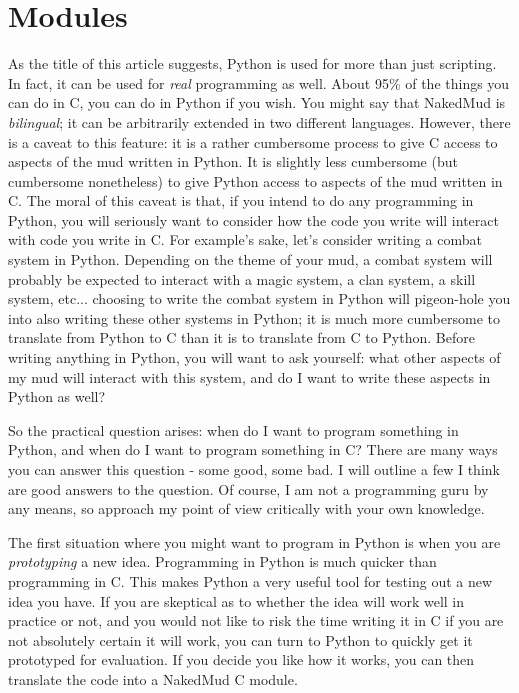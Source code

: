 \documentclass[12pt]{article}
\begin{document}
\newpage \section{Modules}
As the title of this article suggests, Python is used for more than just scripting. In fact, it can be used for {\it real} programming as well. About 95\% of the things you can do in C, you can do in Python if you wish. You might say that NakedMud is {\it bilingual}; it can be arbitrarily extended in two different languages. However, there is a caveat to this feature: it is a rather cumbersome process to give C access to aspects of the mud written in Python. It is slightly less cumbersome (but cumbersome nonetheless) to give Python access to aspects of the mud written in C. The moral of this caveat is that, if you intend to do any programming in Python, you will seriously want to consider how the code you write will interact with code you write in C. For example's sake, let's consider writing a combat system in Python. Depending on the theme of your mud, a combat system will probably be expected to interact with a magic system, a clan system, a skill system, etc... choosing to write the combat system in Python will pigeon-hole you into also writing these other systems in Python; it is much more cumbersome to translate from Python to C than it is to translate from C to Python. Before writing anything in Python, you will want to ask yourself: what other aspects of my mud will interact with this system, and do I want to write these aspects in Python as well?

So the practical question arises: when do I want to program something in Python, and when do I want to program something in C? There are many ways you can answer this question - some good, some bad. I will outline a few I think are good answers to the question. Of course, I am not a programming guru by any means, so approach my point of view critically with your own knowledge.

The first situation where you might want to program in Python is when you are {\it prototyping} a new idea. Programming in Python is much quicker than programming in C. This makes Python a very useful tool for testing out a new idea you have. If you are skeptical as to whether the idea will work well in practice or not, and you would not like to risk the time writing it in C if you are not absolutely certain it will work, you can turn to Python to quickly get it prototyped for evaluation. If you decide you like how it works, you can then translate the code into a NakedMud C module.
\end{document}
